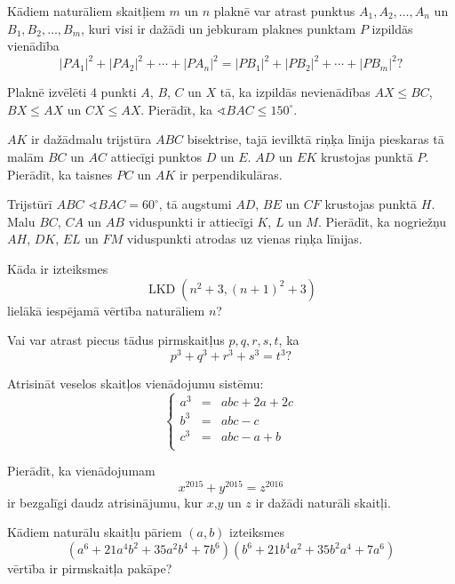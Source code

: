 \documentclass[11pt]{article}
\begin{document}
\begin{problem}[BwTst2016.12]
Kādiem naturāliem skaitļiem $m$ un $n$ plaknē var atrast punktus $A_1, A_2,\ldots,A_n$ un 
$B_1,B_2,\ldots,B_m$, kuri visi ir dažādi un jebkuram plaknes punktam $P$ izpildās vienādība
\[ |PA_1|^2 + |PA_2|^2 + \cdots + |PA_n|^2 = 
|PB_1|^2 + |PB_2|^2 + \cdots + |PB_m|^2 ? \]
\end{problem}

\begin{problem}[BwTst2016.13]
Plaknē izvēlēti $4$ punkti $A$, $B$, $C$ un $X$ tā, ka izpildās nevienādības 
$AX \leq BC$, $BX \leq AX$ un $CX \leq AX$. Pierādīt, ka 
$\sphericalangle BAC \leq 150^{\circ}$. 
\end{problem}

\begin{problem}[BwTst2016.14]
$AK$ ir dažādmalu trijstūra $ABC$ bisektrise, tajā ievilktā riņķa līnija pieskaras 
tā malām $BC$ un $AC$ attiecīgi punktos $D$ un $E$. $AD$ un $EK$ krustojas punktā $P$. 
Pierādīt, ka taisnes $PC$ un $AK$ ir perpendikulāras. 
\end{problem}

\begin{problem}[BwTst2016.15]
Trijstūrī $ABC$ $\sphericalangle BAC = 60^{\circ}$, tā augstumi $AD$, $BE$ un $CF$ 
krustojas punktā $H$. Malu $BC$, $CA$ un $AB$ viduspunkti ir attiecīgi $K$, $L$ un $M$. 
Pierādīt, ka nogriežņu $AH$, $DK$, $EL$ un $FM$ viduspunkti atrodas uz vienas riņķa līnijas. 
\end{problem}

\begin{problem}[BwTst2016.16]
Kāda ir izteiksmes
\[ \operatorname{LKD}\left( n^2 + 3, (n+1)^2 + 3 \right) \]
lielākā iespējamā vērtība naturāliem $n$?  
\end{problem}

\begin{problem}[BwTst2016.17]
Vai var atrast piecus tādus pirmskaitļus $p, q, r, s, t$, ka 
\[ p^3 + q^3 + r^3 + s^3 = t^3 ? \] 
\end{problem}

\begin{problem}[BwTst2016.18]
Atrisināt veselos skaitļos vienādojumu sistēmu:
\[ 
\left\{ \begin{array}{ccl}
a^3 & = & abc + 2a + 2c \\
b^3 & = & abc - c\\
c^3 & = & abc - a + b\\
\end{array} \right. 
\]
\end{problem}

\begin{problem}[BwTst2016.19]
Pierādīt, ka vienādojumam 
\[ x^{2015} + y^{2015} = z^{2016} \]
ir bezgalīgi daudz atrisinājumu, kur $x$,$y$ un $z$ ir dažādi naturāli skaitļi. 
\end{problem}

\begin{problem}[BwTst2016.20]
Kādiem naturālu skaitļu pāriem $(a,b)$ izteiksmes 
\[ \left(a^6 + 21a^4b^2 + 35a^2 b^4 + 7b^6 \right) \left( b^6 + 21 b^4 a^2 + 35 b^2 a^4 + 7a^6 \right) \]
vērtība ir pirmskaitļa pakāpe?
\end{problem}
\end{document}
